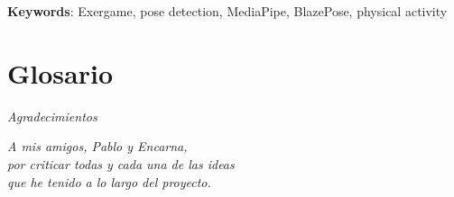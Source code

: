 \vspace{5mm}
\textbf{Keywords}: Exergame, pose detection, MediaPipe, BlazePose, physical activity

\newpage
\section{Glosario}
\begingroup
    \renewcommand{\clearpage}{}
    \renewcommand{\glossarysection}[2][]{}
    \printglossary
\endgroup

\newpage
{}


\begin{minipage}[c][\textheight][c]{\textwidth}
    \centering
    \LARGE
    \textit{Agradecimientos}
    \label{sec:agradecimientos}
    \vspace{0.5cm}

    \large
    \textit{A mis amigos, Pablo y Encarna, \\ por criticar todas y cada una de las ideas \\ que he tenido a lo largo del proyecto.}
\end{minipage}

